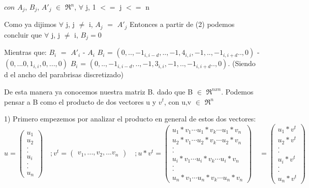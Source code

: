 $con$ $A_j$, $B_j$, $A'_j$ $\in$ $\Re^n$, $\forall$ j, 1 $<=$ j $<=$ n\newline

Como ya dijimos $\forall$ j, j $\neq$ i, $A_j$ $=$ $A'_j$
Entonces a partir de (2) podemos concluir que $\forall$ j, j $\neq$ i, $B_j = 0$\newline

Mientras que:\newline
$B_i$ $=$ $A'_i$ - $A_i$\newline  
$B_i$ =  $(0,..,-1_{i,i-d},..,-1,4_{i,i},-1,..,-1_{i,i+d}..,0)$ - $(0,...0,1_{i,i},0,...,0)$\newline
$B_i$ = $(0,..,-1_{i,i-d},..,-1,3_{i,i},-1,..,-1_{i,i+d}..,0)$. (Siendo d el ancho del parabrisas discretizado)\newline

De esta manera ya conocemos nuestra matriz B. dado que B $\in$ $\Re^{nxn}$. Podemos pensar a B como el producto de dos vectores u y $v^t$, con u,v $\in$ $\Re^{n}$
  

1) Primero empezemos por analizar el producto en general de estos dos vectores: 
$$
u=
\begin{pmatrix} 
u_1\\
u_2\\
.\\
.\\
u_i\\
.\\
.\\
u_n
\end{pmatrix}
\quad
 ;v^t=
\begin{pmatrix} 
v_1,...,v_2,...v_n
\end{pmatrix}
\quad
;u*v^t=
\begin{pmatrix} 
u_1*v_1 \cdots u_1*v_k \cdots u_1*v_n\\
u_2*v_1 \cdots u_2*v_k  \cdots u_2*v_n\\
.\\
.\\
u_i*v_1 \cdots u_i*v_k \cdots u_i*v_n\\
.\\
.\\
u_n*v_1 \cdots u_n*v_k  \cdots u_n*v_n
\end{pmatrix}
\quad
=
\begin{pmatrix} 
u_1*v^t\\
u_2*v^t\\
.\\
.\\
u_i*v^t\\
.\\
.\\
u_n*v^t
\end{pmatrix}
$$


